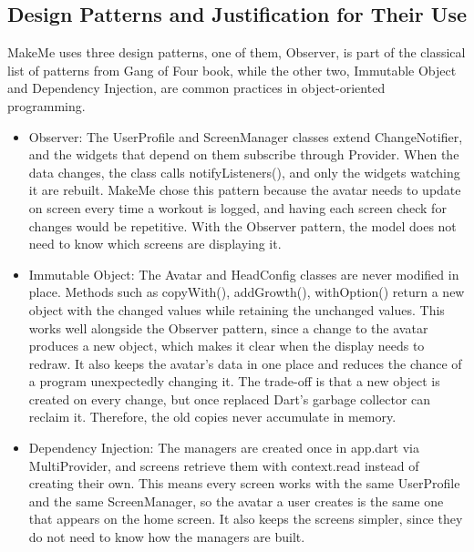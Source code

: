 \documentclass[11pt]{article}
\begin{document}
\subsection{Design Patterns and Justification for Their Use}
MakeMe uses three design patterns, one of them, Observer, is part of the classical list of patterns
from Gang of Four book, while the other two, Immutable Object and Dependency Injection, are common practices
in object-oriented programming.
\begin{itemize}
    \item Observer: The UserProfile and ScreenManager classes extend ChangeNotifier, and the widgets
        that depend on them subscribe through Provider. When the data changes, the class calls notifyListeners(),
        and only the widgets watching it are rebuilt. MakeMe chose this pattern because the avatar needs to update
        on screen every time a workout is logged, and having each screen check for changes would be repetitive.
        With the Observer pattern, the model does not need to know which screens are displaying it.
    \item Immutable Object: The Avatar and HeadConfig classes are never modified in place. Methods such as
        copyWith(), addGrowth(), withOption() return a new object with the changed values while retaining the
        unchanged values. This works well alongside the Observer pattern, since a change to the avatar produces
        a new object, which makes it clear when the display needs to redraw. It also keeps the avatar's data
        in one place and reduces the chance of a program unexpectedly changing it. The trade-off is that a
        new object is created on every change, but once replaced Dart's garbage collector can reclaim it.
        Therefore, the old copies never accumulate in memory.
    \item Dependency Injection: The managers are created once in app.dart via MultiProvider, and screens
        retrieve them with context.read instead of creating their own. This means every screen works with the same UserProfile
        and the same ScreenManager, so the avatar a user creates is the same one that appears on the home screen.
        It also keeps the screens simpler, since they do not need to know how the managers are built.
\end{itemize}

\end{document}
